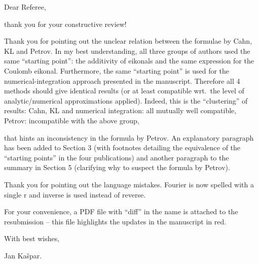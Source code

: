 

\parskip5mm
\parindent5mm

\itskip-3mm

\let\linkColor\cBlue

Dear Referee,

thank you for your constructive review!

Thank you for pointing out the unclear relation between the formulae by Cahn, KL and Petrov. In my best understanding, all three groups of authors used the same ``starting point'': the additivity of eikonals and the same expression for the Coulomb eikonal. Furthermore, the same ``starting point'' is used for the numerical-integration approach presented in the manuscript. Therefore all 4 methods should give identical results (or at least compatible wrt.~the level of analytic/numerical approximations applied). Indeed, this is the ``clustering'' of results:
\> Cahn, KL and numerical integration: all mutually well compatible,
\> Petrov: incompatible with the above group,

\vskip-3mm
\noindent that hints an inconsistency in the formula by Petrov. An explanatory paragraph has been added to Section 3 (with footnotes detailing the equivalence of the ``starting points'' in the four publications) and another paragraph to the summary in Section 5 (clarifying why to suspect the formula by Petrov).

Thank you for pointing out the language mistakes. Fourier is now spelled with a single r and inverse is used instead of reverse.

For your convenience, a PDF file with ``diff'' in the name is attached to the resubmission -- this file highlights the updates in the manuscript in red.

With best wishes,

Jan Ka\v spar.

\bye
